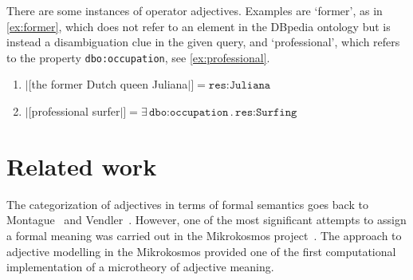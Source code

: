 \documentclass[11pt]{article}
\begin{document}
\vspace{-1.5em}
There are some instances of operator adjectives. Examples are `former', as in \ref{ex:former},
which does not refer to an element in the DBpedia ontology but is instead a disambiguation clue
in the given query, and `professional', which refers 
to the property \texttt{dbo:occupation}, see \ref{ex:professional}.
\begin{enumerate}
\item $|[$the former Dutch queen Juliana$|]=\texttt{res:Juliana}$ \label{ex:former}
\item %
    $|[$professional surfer$|]=\exists\,\texttt{dbo:occupation}\,.\,\texttt{res:Surfing}$ \label{ex:professional}
\end{enumerate}





\section{Related work}

The categorization of adjectives in terms of formal semantics goes back to Montague~ and Vendler~. However, one of the most significant attempts to assign a formal meaning was carried out in the Mikrokosmos project~\cite{raskin1995lexical}. The approach to adjective modelling in the Mikrokosmos provided one of the first computational implementation of a microtheory of adjective meaning.
\end{document}
